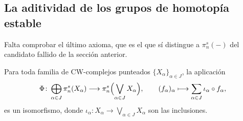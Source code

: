 \subsection{La aditividad de los grupos de homotopía estable}

Falta comprobar el último axioma, que es el que sí distingue a $\pi_n^s(-)$ del candidato fallido de la sección anterior.

\begin{prop}\label{prop:aditividad-pi}
Para toda familia de CW-complejos punteados $\{X_\alpha\}_{\alpha\in J}$, la aplicación
\[
\Phi\colon\bigoplus_{\alpha\in J}\pi_n^s(X_\alpha)\longrightarrow\pi_n^s\Bigl(\bigvee_{\alpha\in J}X_\alpha\Bigr),
\qquad
(f_\alpha)_\alpha\longmapsto\sum_{\alpha\in J}\iota_\alpha\circ f_\alpha,
\]
es un isomorfismo, donde $\iota_\alpha\colon X_\alpha\to\bigvee_{\alpha\in J}X_\alpha$ son las inclusiones.
\end{prop}
